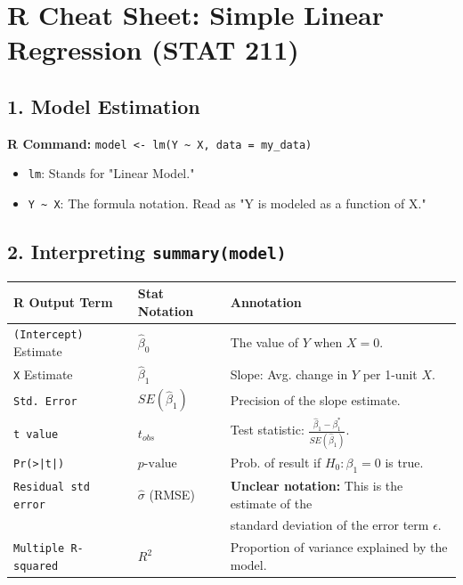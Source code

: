 \documentclass{article}
\begin{document}
\section*{R Cheat Sheet: Simple Linear Regression (STAT 211)}

\subsection*{1. Model Estimation}
\textbf{R Command:} \texttt{model <- lm(Y \textasciitilde{} X, data = my\_data)}

\begin{itemize}
    \item \texttt{lm}: Stands for "Linear Model."
    \item \texttt{Y \textasciitilde{} X}: The formula notation. Read as "Y is modeled as a function of X."
\end{itemize}

\subsection*{2. Interpreting \texttt{summary(model)}}
\begin{center}
\begin{tabular}{lll}
\toprule
\textbf{R Output Term} & \textbf{Stat Notation} & \textbf{Annotation} \\
\midrule
\texttt{(Intercept)} Estimate & $\hat{\beta}_0$ & The value of $Y$ when $X=0$. \\
\texttt{X} Estimate & $\hat{\beta}_1$ & Slope: Avg. change in $Y$ per 1-unit $X$. \\
\texttt{Std. Error} & $SE(\hat{\beta}_1)$ & Precision of the slope estimate. \\
\texttt{t value} & $t_{obs}$ & Test statistic: $\frac{\hat{\beta}_1 - \beta_1^*}{SE(\hat{\beta}_1)}$. \\
\texttt{Pr(>|t|)} & $p\text{-value}$ & Prob. of result if $H_0: \beta_1 = 0$ is true. \\
\texttt{Residual std error} & $\hat{\sigma}$ (RMSE) & \textbf{Unclear notation:} This is the estimate of the \\ 
& & standard deviation of the error term $\epsilon$. \\
\texttt{Multiple R-squared} & $R^2$ & Proportion of variance explained by the model. \\
\bottomrule
\end{tabular}
\end{center}
\end{document}
